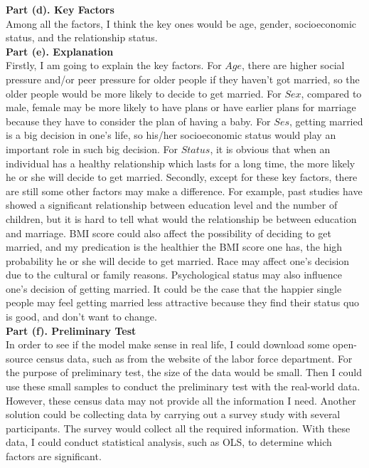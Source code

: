 \documentclass[letterpaper,12pt]{article}
\theoremstyle{definition}
\begin{document}
\textbf{Part (d). Key Factors} \\

Among all the factors, I think the key ones would be age, gender, socioeconomic status, and the relationship status.  \\  

\textbf{Part (e). Explanation} \\

Firstly, I am going to explain the key factors. For $Age$, there are higher social pressure and/or peer pressure for older people if they haven't got married, so the older people would be more likely to decide to get married. For $Sex$, compared to male, female may be more likely to have plans or have earlier plans for marriage because they have to consider the plan of having a baby. For $Ses$, getting married is a big decision in one's life, so his/her socioeconomic status would play an important role in such big decision. For $Status$, it is obvious that when an individual has a healthy relationship which lasts for a long time, the more likely he or she will decide to get married. Secondly, except for these key factors, there are still some other factors may make a difference. For example, past studies have showed a significant relationship between education level and the number of children, but it is hard to tell what would the relationship be between education and marriage. BMI score could also affect the possibility of deciding to get married, and my predication is the healthier the BMI score one has, the high probability he or she will decide to get married. Race may affect one's decision due to the cultural or family reasons. Psychological status may also influence one's decision of getting married. It could be the case that the happier single people may feel getting married less attractive because they find their status quo is good, and don't want to change. \\


\textbf{Part (f). Preliminary Test} \\

In order to see if the model make sense in real life, I could download some open-source census data, such as from the website of the labor force department. For the purpose of preliminary test, the size of the data would be small. Then I could use these small samples to conduct the preliminary test with the real-world data. However, these census data may not provide all the information I need. Another solution could be collecting data by carrying out a survey study with several participants. The survey would collect all the required information. With these data, I could conduct statistical analysis, such as OLS, to determine which factors are significant. 
\end{document}
